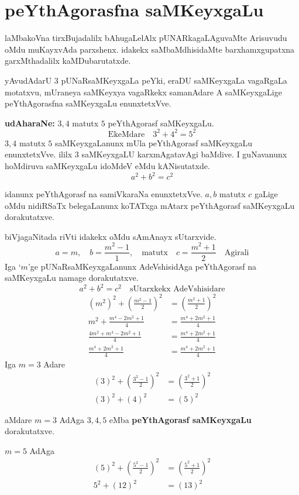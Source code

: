 \chapter{peYthAgorasfna saMKeyxgaLu}
\vskip -20pt

laMbakoVna tirxBujadalilx bAhugaLelAlx pUNARkagaLAguvaMte Arisuvudu oMdu muKayxvAda parxshenx. idakekx saMbaMdhisidaMte barxhamxgupatxna garxMthadalilx kaMDubarutatxde.

yAvudAdarU $3$ pUNaRsaMKeyxgaLa peYki, eraDU saMKeyxgaLa vagaRgaLa motatxvu, mUraneya saMKeyxya vagaRkekx samanAdare A saMKeyxgaLige peYthAgorasfna saMKeyxgaLu enunxtetxVve.

\textbf{udAharaNe:} $3,4$ matutx $5$  peYthAgorasf saMKeyxgaLu.
$$
\text{EkeMdare}\quad 3^2+4^2=5^2
$$
$3,4$ matutx $5$ saMKeyxgaLanunx mUla peYthAgorasf saMKeyxgaLu enunxtetxVve. ililx $3$ saMKeyx\-gaLU karxmAgatavAgi baMdive. I guNavanunx hoMdiruva saMKeyxgaLu idoMdeV eMdu kANisutatxde.
$$
a^2+b^2 = c^2
$$

idanunx peYthAgorasf  na samiVkaraNa enunxtetxVve. $a,b$ matutx $c$ gaLige oMdu nidiRSaTx belegaLanunx koTATxga mAtarx peYthAgorasf saMKeyxgaLu dorakutatxve.

biVjagaNitada riVti idakekx oMdu sAmAnayx sUtarxvide.
$$
a=m, \quad b= \frac{m^2-1}{1}, \quad\text{matutx} \quad c=\frac{m^2+1}{2} \quad \text{Agirali}
$$
Iga `$m$'ge pUNaRsaMKeyxgaLanunx AdeVshisidAga peYthAgorasf na saMKeyxgaLu namage dorakutatxve.
$$
a^2+b^2=c^2 \quad\text{sUtarxkekx AdeVshisidare}
$$
\begin{align*}
\left(m^2\right)^2+\left(\frac{m^2-1}{2}\right)^2 &= \left(\frac{m^2+1}{2}\right)^2\\
m^2+ \frac{m^4-2m^2+1}{4} &= \frac{m^4+2m^2+1}{4}\\
\frac{4m^2+m^4-2m^2+1}{4} &= \frac{m^4+2m^2+1}{4}\\
\frac{m^4+2m^2+1}{4} &= \frac{m^4+2m^2+1}{4}
\end{align*}
Iga $m=3$ Adare
\begin{align*}
(3)^2+\left(\frac{3^{2}-1}{2}\right)^2 &= \left(\frac{3^2+1}{2}\right)^2\\
(3)^2+(4)^2 &= (5)^2
\end{align*}

aMdare $m=3$ AdAga $3,4,5$ eMba {\bf peYthAgorasf saMKeyxgaLu} dorakutatxve.

$m=5$ \quad AdAga
\begin{align*}
(5)^2 + \left(\frac{5^2-1}{2}\right)^2 &= \left(\frac{5^2+1}{2}\right)^2\\
5^2 +(12)^2 &= (13)^2
\end{align*}

